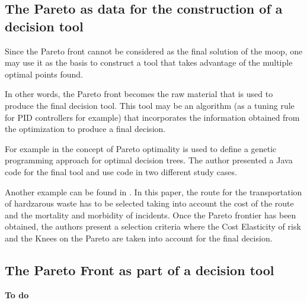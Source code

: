 \subsection{The Pareto as data for the construction of a decision tool}
\label{sec:ParetoData}
%
Since the Pareto front cannot be considered as the final solution of the \gls{moop}, one may use it as the basis to construct a tool that takes advantage of the multiple optimal points found.

In other words, the Pareto front becomes the raw material that is used to produce the final decision tool. This tool may be an algorithm (as a tuning rule for PID controllers for example) that incorporates the information obtained from the optimization to produce a final decision.

For example in \cite{Zhao2007}	the concept of Pareto optimality is used to define a genetic programming approach for optimal decision trees. The author presented a Java code for the final tool and use code in two different study cases.

Another example can be found in \cite{Das2012}. In this paper, the route for the transportation of hardzarous waste has to be selected taking into account the cost of the route and the mortality and morbidity of incidents. Once the Pareto frontier has been obtained, the authors present a selection criteria where the Cost Elasticity of risk and the Knees on the Pareto are taken into account for the final decision.



\subsection{The Pareto Front as part of a decision tool}
\label{sec:ParetoDecision}
\textbf{To do}



















